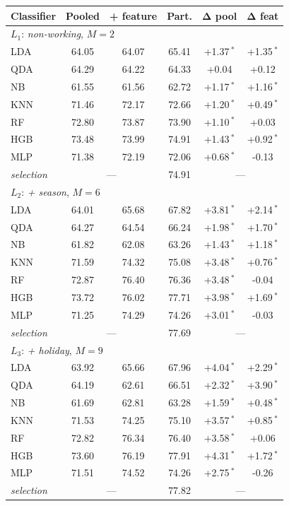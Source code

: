 \begin{tabular}{@{}lccccc@{}}
\toprule
\textbf{Classifier} & \textbf{Pooled} & \textbf{+ feature} & \textbf{Part.} & $\boldsymbol{\Delta}$\textbf{ pool} & $\boldsymbol{\Delta}$\textbf{ feat}\\
\midrule
\multicolumn{6}{l}{$L_1$: \textit{non-working}, $M=2$}\\
LDA & 64.05 & 64.07 & 65.41 & +1.37\,$^{*}$ & +1.35\,$^{*}$ \\
QDA & 64.29 & 64.22 & 64.33 & +0.04\phantom{\,$^{*}$} & +0.12\phantom{\,$^{*}$} \\
NB & 61.55 & 61.56 & 62.72 & +1.17\,$^{*}$ & +1.16\,$^{*}$ \\
KNN & 71.46 & 72.17 & 72.66 & +1.20\,$^{*}$ & +0.49\,$^{*}$ \\
RF & 72.80 & 73.87 & 73.90 & +1.10\,$^{*}$ & +0.03\phantom{\,$^{*}$} \\
HGB & 73.48 & 73.99 & 74.91 & +1.43\,$^{*}$ & +0.92\,$^{*}$ \\
MLP & 71.38 & 72.19 & 72.06 & +0.68\,$^{*}$ & -0.13\phantom{\,$^{*}$} \\
\textit{selection} & \multicolumn{2}{c}{---} & 74.91 & \multicolumn{2}{c}{---}\\
\midrule
\multicolumn{6}{l}{$L_2$: \textit{+ season}, $M=6$}\\
LDA & 64.01 & 65.68 & 67.82 & +3.81\,$^{*}$ & +2.14\,$^{*}$ \\
QDA & 64.27 & 64.54 & 66.24 & +1.98\,$^{*}$ & +1.70\,$^{*}$ \\
NB & 61.82 & 62.08 & 63.26 & +1.43\,$^{*}$ & +1.18\,$^{*}$ \\
KNN & 71.59 & 74.32 & 75.08 & +3.48\,$^{*}$ & +0.76\,$^{*}$ \\
RF & 72.87 & 76.40 & 76.36 & +3.48\,$^{*}$ & -0.04\phantom{\,$^{*}$} \\
HGB & 73.72 & 76.02 & 77.71 & +3.98\,$^{*}$ & +1.69\,$^{*}$ \\
MLP & 71.25 & 74.29 & 74.26 & +3.01\,$^{*}$ & -0.03\phantom{\,$^{*}$} \\
\textit{selection} & \multicolumn{2}{c}{---} & 77.69 & \multicolumn{2}{c}{---}\\
\midrule
\multicolumn{6}{l}{$L_3$: \textit{+ holiday}, $M=9$}\\
LDA & 63.92 & 65.66 & 67.96 & +4.04\,$^{*}$ & +2.29\,$^{*}$ \\
QDA & 64.19 & 62.61 & 66.51 & +2.32\,$^{*}$ & +3.90\,$^{*}$ \\
NB & 61.69 & 62.81 & 63.28 & +1.59\,$^{*}$ & +0.48\,$^{*}$ \\
KNN & 71.53 & 74.25 & 75.10 & +3.57\,$^{*}$ & +0.85\,$^{*}$ \\
RF & 72.82 & 76.34 & 76.40 & +3.58\,$^{*}$ & +0.06\phantom{\,$^{*}$} \\
HGB & 73.60 & 76.19 & 77.91 & +4.31\,$^{*}$ & +1.72\,$^{*}$ \\
MLP & 71.51 & 74.52 & 74.26 & +2.75\,$^{*}$ & -0.26\phantom{\,$^{*}$} \\
\textit{selection} & \multicolumn{2}{c}{---} & 77.82 & \multicolumn{2}{c}{---}\\
\bottomrule
\end{tabular}
